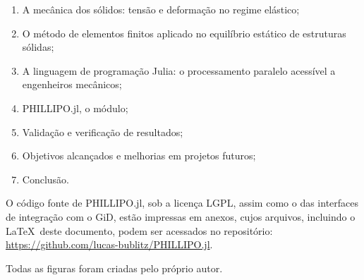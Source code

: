 \begin{enumerate}
    \item A mecânica dos sólidos: tensão e deformação no regime elástico;
    \item O método de elementos finitos aplicado no equilíbrio estático de estruturas sólidas;
    \item A linguagem de programação Julia: o processamento paralelo acessível a engenheiros mecânicos;
    \item PHILLIPO.jl, o módulo;
    \item Validação e verificação de resultados;
    \item Objetivos alcançados e melhorias em projetos futuros;
    \item Conclusão.
\end{enumerate}

O código fonte de PHILLIPO.jl, sob a licença LGPL, assim como o das interfaces de integração com o GiD, estão impressas em anexos, cujos arquivos, incluindo o \LaTeX\ deste documento, podem ser acessados no repositório: \url{https://github.com/lucas-bublitz/PHILLIPO.jl}.

Todas as figuras foram criadas pelo próprio autor.